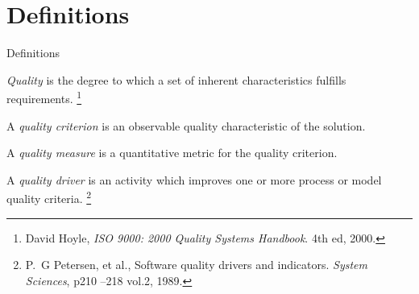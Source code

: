 \section{Definitions}

\begin{frame}{Definitions}

  \begin{definition}
   \emph{Quality} is the degree to which a set of inherent characteristics fulfills requirements.
	 \footnote{David Hoyle, {\em {ISO} 9000: 2000 Quality Systems Handbook}. 4th ed, 2000.}
  \end{definition}

  \begin{definition}
   A \emph{quality criterion} is an observable quality characteristic of the solution.
  \end{definition}

  \begin{definition}
   A \emph{quality measure} is a quantitative metric for the quality criterion.
  \end{definition}

  \begin{definition}
	 	 A \emph{quality driver} is an activity which improves one or more process or model quality criteria.
	 \footnote{P.~G Petersen, et al., Software quality drivers and indicators. {\em System Sciences}, p210 --218 vol.2, 1989.}
  \end{definition}
\end{frame}